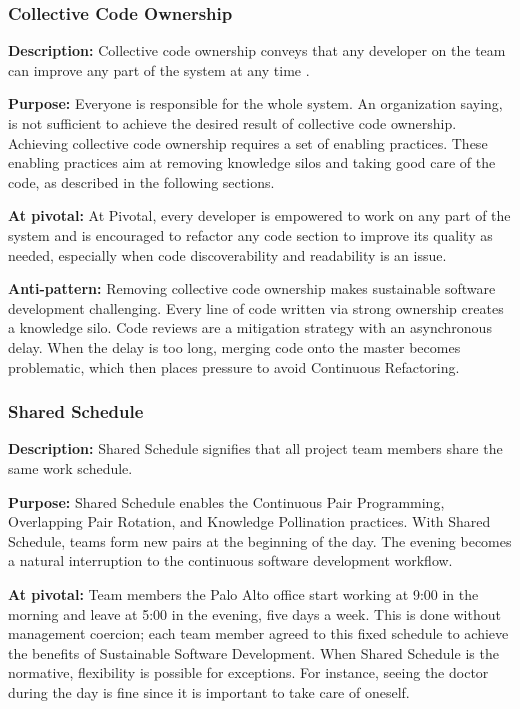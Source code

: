 \begin{table}[]
\subsubsection{Collective Code Ownership}

\textbf{Description:} Collective code ownership conveys that any developer on the team can improve any part of the system at any time \cite{ExtremeProgramming2004}. 

\textbf{Purpose:} Everyone is responsible for the whole system. An organization saying,  is not sufficient to achieve the desired result of collective code ownership. Achieving collective code ownership requires a set of enabling practices. These enabling practices aim at removing knowledge silos and taking good care of the code, as described in the following sections.

\textbf{At pivotal:} At Pivotal, every developer is empowered to work on any part of the system and is encouraged to refactor any code section to improve its quality as needed, especially when code discoverability and readability is an issue.

\textbf{Anti-pattern:} Removing collective code ownership makes sustainable software development challenging. Every line of code written via strong ownership creates a knowledge silo. Code reviews are a mitigation strategy with an asynchronous delay. When the delay is too long, merging code onto the master becomes problematic, which then places pressure to avoid Continuous Refactoring.  

\subsubsection{Shared Schedule}
\textbf{Description:} Shared Schedule signifies that all project team members share the same work schedule. 

\textbf{Purpose:} Shared Schedule enables the Continuous Pair Programming, Overlapping Pair Rotation, and Knowledge Pollination practices. With Shared Schedule, teams form new pairs at the beginning of the day. The evening becomes a natural interruption to the continuous software development workflow. 

\textbf{At pivotal:} Team members the Palo Alto office start working at 9:00 in the morning and leave at 5:00 in the evening, five days a week. This is done without management coercion; each team member agreed to this fixed schedule to achieve the benefits of Sustainable Software Development. When Shared Schedule is the normative, flexibility is possible for exceptions. For instance, seeing the doctor during the day is fine since it is important to take care of oneself.


\end{table}

